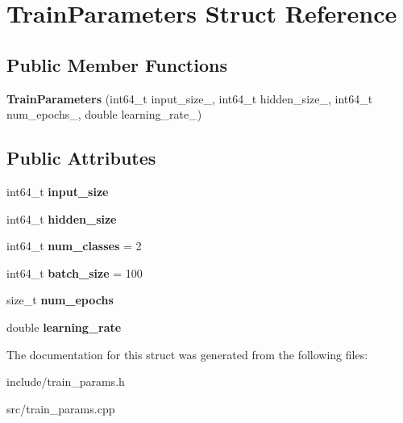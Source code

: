 \hypertarget{structTrainParameters}{}\section{Train\+Parameters Struct Reference}
\label{structTrainParameters}
\subsection*{Public Member Functions}
\begin{DoxyCompactItemize}
\item 
\mbox{\label{structTrainParameters_acaeec45398c2090156ffc19625d44626}} 
{\bfseries Train\+Parameters} (int64\+\_\+t input\+\_\+size\+\_\+, int64\+\_\+t hidden\+\_\+size\+\_\+, int64\+\_\+t num\+\_\+epochs\+\_\+, double learning\+\_\+rate\+\_\+)
\end{DoxyCompactItemize}
\subsection*{Public Attributes}
\begin{DoxyCompactItemize}
\item 
\mbox{\label{structTrainParameters_a29c27e8e824654b77fc82b5c70dc8a03}} 
int64\+\_\+t {\bfseries input\+\_\+size}
\item 
\mbox{\label{structTrainParameters_a9c359e4eee9a6fc60e4793b4e5792d88}} 
int64\+\_\+t {\bfseries hidden\+\_\+size}
\item 
\mbox{\label{structTrainParameters_accc7ca6d976c745aeea4cf739a0fa495}} 
int64\+\_\+t {\bfseries num\+\_\+classes} = 2
\item 
\mbox{\label{structTrainParameters_a631d0ffb1d18e37d0154e20e67ba956d}} 
int64\+\_\+t {\bfseries batch\+\_\+size} = 100
\item 
\mbox{\label{structTrainParameters_a5fac5d84ccfb08ff00a85bac7690baf9}} 
size\+\_\+t {\bfseries num\+\_\+epochs}
\item 
\mbox{\label{structTrainParameters_ae814459c8d66e813161aa0a99cd36c47}} 
double {\bfseries learning\+\_\+rate}
\end{DoxyCompactItemize}


The documentation for this struct was generated from the following files\+:\begin{DoxyCompactItemize}
\item 
include/train\+\_\+params.\+h\item 
src/train\+\_\+params.\+cpp\end{DoxyCompactItemize}
